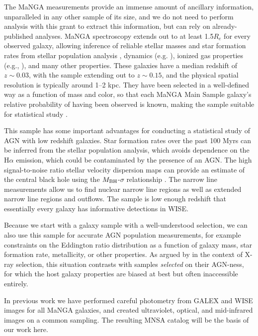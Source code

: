 \documentclass[12pt, preprint]{hacked-aastex}
\begin{document}
The MaNGA measurements provide an immense amount of ancillary
information, unparalleled in any other sample of its size, and we do
not need to perform analysis with this grant to extract this
information, but can rely on already-published analyses.  MaNGA
spectroscopy extends out to at least 1.5$R_e$ for every observed
galaxy, allowing inference of reliable stellar masses and star
formation rates from stellar population analysis \cite{sanchez22a},
dynamics (e.g. \cite{graham18a}), ionized gas properties (e.g.,
\cite{belfiore17a}), and many other properties.  These galaxies have a
median redshift of $z\sim0.03$, with the sample extending out to
$z\sim 0.15$, and the physical spatial resolution is typically around
1--2 kpc. They have been selected in a well-defined way as a function
of mass and color, so that each MaNGA Main Sample galaxy's relative
probability of having been observed is known, making the sample
suitable for statistical study \cite{wake17a}.

This sample has some important advantages for conducting a statistical
study of AGN with low redshift galaxies.  Star formation rates over
the past 100 Myrs can be inferred from the stellar population
analysis, which avoids dependence on the H$\alpha$ emission, which
could be contaminated by the presence of an AGN.  The high
signal-to-noise ratio stellar velocity dispersion maps can provide an
estimate of the central black hole using the $M_{\rm BH}$-$\sigma$
relationship \cite{kormendy04b}. The narrow line measurements allow us
to find nuclear narrow line regions as well as extended narrow line
regions and outflows. The sample is low enough redshift that
essentially every galaxy has informative detections in WISE.

Because we start with a galaxy sample with a well-understood
selection, we can also use this sample for accurate AGN population
measurements, for example constraints on the Eddington ratio
distribution as a function of galaxy mass, star formation rate,
metallicity, or other properties.  As argued by \cite{aird12a} in the
context of X-ray selection, this situation contrasts with samples {\it
  selected} on their AGN-ness, for which the host galaxy properties
are biased at best but often inaccessible entirely.

In previous work we have performed careful photometry from GALEX and
WISE images for all MaNGA galaxies, and created ultraviolet, optical,
and mid-infrared images on a common sampling. The resulting MNSA
catalog will be the basis of our work here.
\end{document}
